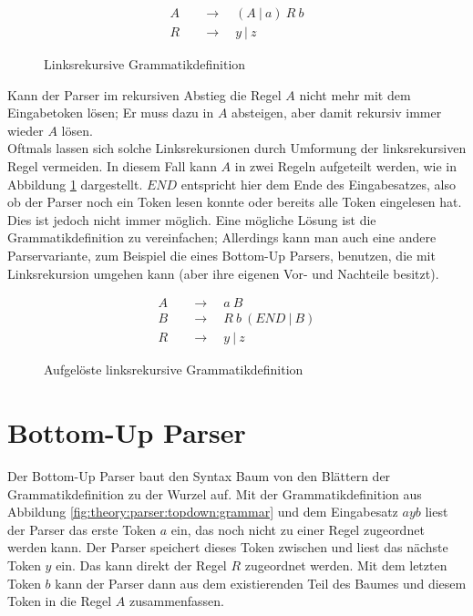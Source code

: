 \begin{figure}[H]
  \begin{align*}
    A &\quad\rightarrow\quad (A\ |\ a)\ R\ b \\
    R &\quad\rightarrow\quad y\ |\ z
  \end{align*}
  \caption{Linksrekursive Grammatikdefinition}
\end{figure}

Kann der Parser im rekursiven Abstieg die Regel $A$ nicht mehr mit dem Eingabetoken lösen; Er muss dazu in $A$ absteigen, aber damit rekursiv immer wieder $A$ lösen.\\
Oftmals lassen sich solche Linksrekursionen durch Umformung der linksrekursiven Regel vermeiden.
In diesem Fall kann $A$ in zwei Regeln aufgeteilt werden, wie in Abbildung \ref{fig:theory:parser:topdown:recursive} dargestellt.
$END$ entspricht hier dem Ende des Eingabesatzes, also ob der Parser noch ein Token lesen konnte oder bereits alle Token eingelesen hat.\\
Dies ist jedoch nicht immer möglich.
Eine mögliche Lösung ist die Grammatikdefinition zu vereinfachen;
Allerdings kann man auch eine andere Parservariante, zum Beispiel die eines Bottom-Up Parsers, benutzen, die mit Linksrekursion umgehen kann (aber ihre eigenen Vor- und Nachteile besitzt).

\begin{figure}[H]
  \begin{align*}
    A &\quad\rightarrow\quad a\ B \\
    B &\quad\rightarrow\quad R\ b\ (END\ |\ B) \\
    R &\quad\rightarrow\quad y\ |\ z
  \end{align*}
  \caption{Aufgelöste linksrekursive Grammatikdefinition}
  \label{fig:theory:parser:topdown:recursive}
\end{figure}

\section{Bottom-Up Parser}

Der Bottom-Up Parser baut den Syntax Baum von den Blättern der Grammatikdefinition zu der Wurzel auf\cite{meduna2007elements}.
Mit der Grammatikdefinition aus Abbildung \ref{fig:theory:parser:topdown:grammar} und dem Eingabesatz $a y b$ liest der Parser das erste Token $a$ ein, das noch nicht zu einer Regel zugeordnet werden kann.
Der Parser speichert dieses Token zwischen und liest das nächste Token $y$ ein.
Das kann direkt der Regel $R$ zugeordnet werden.
Mit dem letzten Token $b$ kann der Parser dann aus dem existierenden Teil des Baumes und diesem Token in die Regel $A$ zusammenfassen.

